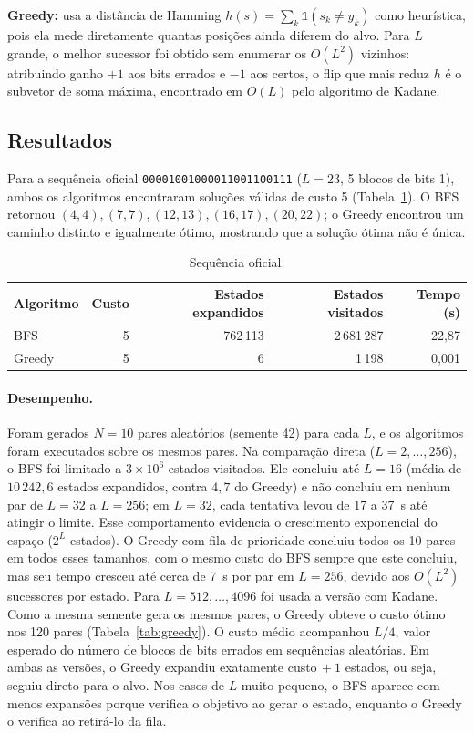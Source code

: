 \documentclass[11pt,a4paper]{article}
\begin{document}
\textbf{Greedy:} usa a distância de Hamming $h(s)=\sum_k \mathbb{1}(s_k\neq y_k)$ como heurística, pois ela mede diretamente quantas posições ainda diferem do alvo. Para $L$ grande, o melhor sucessor foi obtido sem enumerar os $O(L^2)$ vizinhos: atribuindo ganho $+1$ aos bits errados e $-1$ aos certos, o flip que mais reduz $h$ é o subvetor de soma máxima, encontrado em $O(L)$ pelo algoritmo de Kadane.

\subsection{Resultados}
Para a sequência oficial \texttt{00001001000011001100111} ($L=23$, 5 blocos de bits 1), ambos os algoritmos encontraram soluções válidas de custo 5 (Tabela~\ref{tab:oficial}). O BFS retornou $(4,4),(7,7),(12,13),(16,17),(20,22)$; o Greedy encontrou um caminho distinto e igualmente ótimo, mostrando que a solução ótima não é única.

\begin{table}[h]
\centering
\caption{Sequência oficial.}
\label{tab:oficial}
\begin{tabular}{lrrrr}
\toprule
Algoritmo & Custo & Estados expandidos & Estados visitados & Tempo (s)\\
\midrule
BFS & 5 & 762\,113 & 2\,681\,287 & 22,87\\
Greedy & 5 & 6 & 1\,198 & 0,001\\
\bottomrule
\end{tabular}
\end{table}

\paragraph{Desempenho.} Foram gerados $N=10$ pares aleatórios (semente 42) para cada $L$, e os algoritmos foram executados sobre os mesmos pares. Na comparação direta ($L=2,\dots,256$), o BFS foi limitado a $3\times10^6$ estados visitados. Ele concluiu até $L=16$ (média de $10\,242{,}6$ estados expandidos, contra $4{,}7$ do Greedy) e não concluiu em nenhum par de $L=32$ a $L=256$; em $L=32$, cada tentativa levou de 17 a 37~s até atingir o limite. Esse comportamento evidencia o crescimento exponencial do espaço ($2^L$ estados). O Greedy com fila de prioridade concluiu todos os 10 pares em todos esses tamanhos, com o mesmo custo do BFS sempre que este concluiu, mas seu tempo cresceu até cerca de 7~s por par em $L=256$, devido aos $O(L^2)$ sucessores por estado. Para $L=512,\dots,4096$ foi usada a versão com Kadane. Como a mesma semente gera os mesmos pares, o Greedy obteve o custo ótimo nos 120 pares (Tabela~\ref{tab:greedy}). O custo médio acompanhou $L/4$, valor esperado do número de blocos de bits errados em sequências aleatórias. Em ambas as versões, o Greedy expandiu exatamente custo$\,+1$ estados, ou seja, seguiu direto para o alvo. Nos casos de $L$ muito pequeno, o BFS aparece com menos expansões porque verifica o objetivo ao gerar o estado, enquanto o Greedy o verifica ao retirá-lo da fila.
\end{document}
